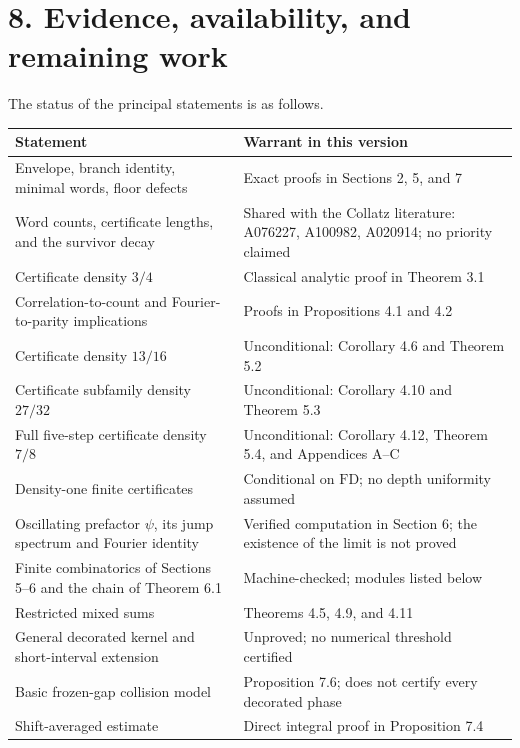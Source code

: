 \documentclass[11pt,a4paper]{article}
\begin{document}
\section{8. Evidence, availability, and remaining
work}\label{evidence-availability-and-remaining-work}

The status of the principal statements is as follows.

\begingroup\small

\begin{longtable}[]{@{}
  >{\raggedright\arraybackslash}p{}
  >{\raggedright\arraybackslash}p{}@{}}
\toprule\noalign{}
\begin{minipage}[b]{\linewidth}\raggedright
Statement
\end{minipage} & \begin{minipage}[b]{\linewidth}\raggedright
Warrant in this version
\end{minipage} \\
\midrule\noalign{}
\endhead
\bottomrule\noalign{}
\endlastfoot
Envelope, branch identity, minimal words, floor defects & Exact proofs
in Sections 2, 5, and 7 \\
Word counts, certificate lengths, and the survivor decay & Shared with
the Collatz literature: A076227, A100982, A020914; no priority
claimed \\
Certificate density \(3/4\) & Classical analytic proof in Theorem 3.1 \\
Correlation-to-count and Fourier-to-parity implications & Proofs in
Propositions 4.1 and 4.2 \\
Certificate density \(13/16\) & Unconditional: Corollary 4.6 and Theorem
5.2 \\
Certificate subfamily density \(27/32\) & Unconditional: Corollary 4.10
and Theorem 5.3 \\
Full five-step certificate density \(7/8\) & Unconditional: Corollary
4.12, Theorem 5.4, and Appendices A--C \\
Density-one finite certificates & Conditional on \(\mathrm{FD}\); no
depth uniformity assumed \\
Oscillating prefactor \(\psi\), its jump spectrum and Fourier identity &
Verified computation in Section 6; the existence of the limit is not
proved \\
Finite combinatorics of Sections 5--6 and the chain of Theorem 6.1 &
Machine-checked; modules listed below \\
Restricted mixed sums & Theorems 4.5, 4.9, and 4.11 \\
General decorated kernel and short-interval extension & Unproved; no
numerical threshold certified \\
Basic frozen-gap collision model & Proposition 7.6; does not certify
every decorated phase \\
Shift-averaged estimate & Direct integral proof in Proposition 7.4 \\
\end{longtable}
\end{document}
